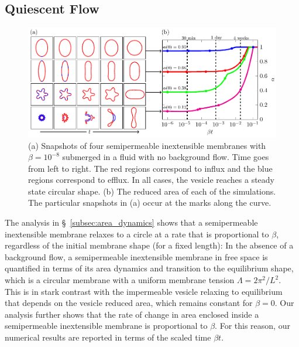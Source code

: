 \documentclass[prb,preprint,showpacs,preprintnumbers,amsmath,amssymb,longbibliography]{revtex4-1}
\newif\ifTikz
\begin{document}
\subsection{Quiescent Flow} 
\begin{figure}[htp]
  \centering
  \ifTikz
  
  \else
  \includegraphics{figures/relaxationComposite.pdf}
  \fi
  \caption{\label{fig:relaxationComposite} (a) Snapshots of four
  semipermeable inextensible membranes with $\beta = 10^{-8}$ submerged in a fluid
  with no background flow. Time goes from left to right. The red regions
  correspond to influx and the blue regions correspond to efflux. In all
  cases, the vesicle reaches a steady state circular shape. (b) The
  reduced area of each of the simulations. The particular snapshots in
  (a) occur at the marks along the curve.}
\end{figure}
The analysis in \S~\ref{subsec:area_dynamics} shows
that a semipermeable inextensible membrane relaxes to a circle at a rate that is
proportional to $\beta$, regardless of the initial membrane shape (for a fixed length):
In the absence of a background flow, a semipermeable inextensible membrane in free
space is quantified in terms of its area dynamics and transition
to the equilibrium shape, which is a circular membrane with a uniform 
membrane tension $\Lambda = 2\pi^2/L^2$.
This is in stark contrast with the impermeable vesicle relaxing to equilibrium that depends on the vesicle reduced area,  which remains constant for $\beta=0$.
%
Our analysis further shows that the rate of change in area enclosed inside a
semipermeable inextensible membrane is proportional to $\beta$. For this reason,
our numerical results are reported in terms of the scaled time $\beta t$.
\end{document}
